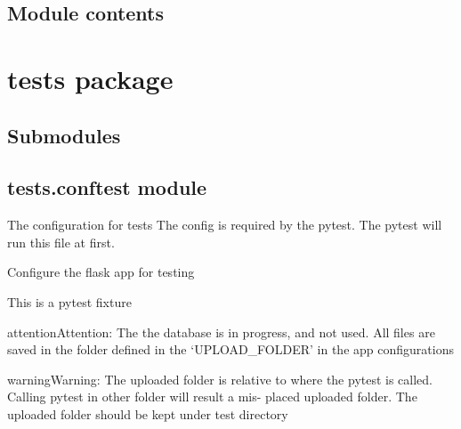 \documentclass[letterpaper,10pt,english]{sphinxmanual}
\begin{document}
\section{Module contents}
\label{\detokenize{cloudmesh:module-cloudmesh}}\label{\detokenize{cloudmesh:module-contents}}

\chapter{tests package}
\label{\detokenize{tests:tests-package}}\label{\detokenize{tests::doc}}

\section{Submodules}
\label{\detokenize{tests:submodules}}

\section{tests.conftest module}
\label{\detokenize{tests:module-tests.conftest}}\label{\detokenize{tests:tests-conftest-module}}
The configuration for tests
The config is required by the pytest. The pytest will run this file at first.

\begin{fulllineitems}
\label{\detokenize{tests:tests.conftest.app}}
Configure the flask app for testing

This is a pytest fixture

\begin{sphinxadmonition}{attention}{Attention:}
The the database is in progress, and not used. All files are saved in the folder defined in the ‘UPLOAD\_FOLDER’
in the app configurations
\end{sphinxadmonition}

\begin{sphinxadmonition}{warning}{Warning:}
The uploaded folder is relative to where the pytest is called. Calling pytest in other folder will result a mis-
placed uploaded folder. The uploaded folder should be kept under test directory
\end{sphinxadmonition}

\end{fulllineitems}
\end{document}
